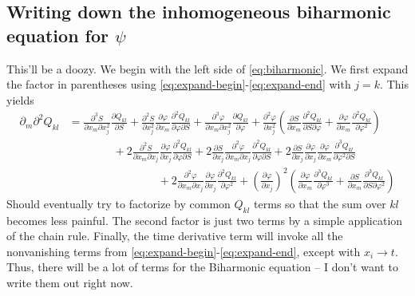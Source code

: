 \documentclass[reqno]{article}
\begin{document}
	\subsection{Writing down the inhomogeneous biharmonic equation for $\psi$}
	This'll be a doozy. We begin with the left side of \eqref{eq:biharmonic}. We first expand the factor in parentheses using \eqref{eq:expand-begin}-\eqref{eq:expand-end} with $j = k$. This yields
	\begin{equation}
	\begin{split}
		\partial_m\partial^2 Q_{kl} &= \frac{\partial^3 S}{\partial x_m \partial x_j^2} \frac{\partial Q_{kl}}{\partial S} + \frac{\partial^2 S}{\partial x_j^2}\frac{\partial \varphi}{\partial x_m}\frac{\partial^2 Q_{kl}}{\partial \varphi \partial S} + \frac{\partial^3 \varphi}{\partial x_m \partial x_j^2}\frac{\partial Q_{kl}}{\partial \varphi} + \frac{\partial^2 \varphi}{\partial x_j^2} \left( \frac{\partial S}{\partial x_m} \frac{\partial^2 Q_{kl}}{\partial S \partial \varphi} + \frac{\partial \varphi}{\partial x_m}\frac{\partial^2 Q_{kl}}{\partial \varphi^2} \right) \\
		&\qquad\qquad + 2\frac{\partial^2 S}{\partial x_m \partial x_j}\frac{\partial \varphi}{\partial x_j} \frac{\partial^2 Q_{kl}}{\partial \varphi \partial S} + 2\frac{\partial S}{\partial x_j}\frac{\partial^2 \varphi}{\partial x_m \partial x_j}\frac{\partial^2 Q_{kl}}{\partial \varphi \partial S} + 2\frac{\partial S}{\partial x_j}\frac{\partial \varphi}{\partial x_j} \frac{\partial \varphi}{\partial x_m}\frac{\partial^3 Q_{kl}}{\partial \varphi^2 \partial S} \\
		&\qquad\qquad\qquad\qquad + 2\frac{\partial^2 \varphi}{\partial x_m \partial x_j}\frac{\partial \varphi}{\partial x_j} \frac{\partial^2 Q_{kl}}{\partial \varphi^2} + \left( \frac{\partial \varphi}{\partial x_j} \right)^2 \left( \frac{\partial \varphi}{\partial x_m}\frac{\partial^3 Q_{kl}}{\partial \varphi^3} + \frac{\partial S}{\partial x_m}\frac{\partial^3 Q_{kl}}{\partial S\partial \varphi^2} \right)
	\end{split}
	\end{equation}
	Should eventually try to factorize by common $Q_{kl}$ terms so that the sum over $kl$ becomes less painful. The second factor is just two terms by a simple application of the chain rule. Finally, the time derivative term will invoke all the nonvanishing terms from \eqref{eq:expand-begin}-\eqref{eq:expand-end}, except with $x_i \to t$. Thus, there will be a lot of terms for the Biharmonic equation -- I don't want to write them out right now. 
	
\end{document}
